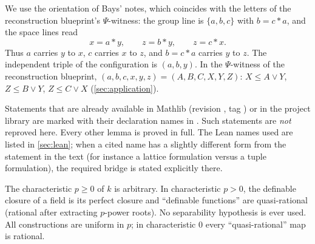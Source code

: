 \begin{convention}[orientation]\label{conv:orientation}
We use the orientation of Bays' notes, which coincides with the letters of the
reconstruction blueprint's $\Psi$-witness: the group line is $\{a,b,c\}$ with
\emph{$b=c\ast a$}, and the space lines read
\[
   x=a\ast y,\qquad z=b\ast y,\qquad z=c\ast x .
\]
Thus $a$ carries $y$ to $x$, $c$ carries $x$ to $z$, and $b=c\ast a$ carries $y$ to
$z$.  The independent triple of the configuration is $(a,b,y)$.  In the
$\Psi$-witness of the reconstruction blueprint, $(a,b,c,x,y,z)=(A,B,C,X,Y,Z)$:
$X\le A\vee Y$, $Z\le B\vee Y$, $Z\le C\vee X$ (\cref{sec:application}).
\end{convention}

\begin{convention}\label{conv:lean}
Statements that are already available in Mathlib (revision
, tag ) or in the project library  are
marked with their declaration names in .  Such statements are
\emph{not} reproved here.  Every other lemma is proved in full.  The Lean names
used are listed in \cref{sec:lean}; when a cited name has a slightly different
form from the statement in the text (for instance a lattice formulation versus a
tuple formulation), the required bridge is stated explicitly there.
\end{convention}

\begin{convention}[characteristic]\label{conv:char}
The characteristic $p\ge 0$ of $k$ is arbitrary.  In characteristic $p>0$, the
definable closure of a field is its perfect closure and ``definable functions'' are
quasi-rational (rational after extracting $p$-power roots).  No separability
hypothesis is ever used.  All constructions are uniform in $p$; in characteristic
$0$ every ``quasi-rational'' map is rational.
\end{convention}
